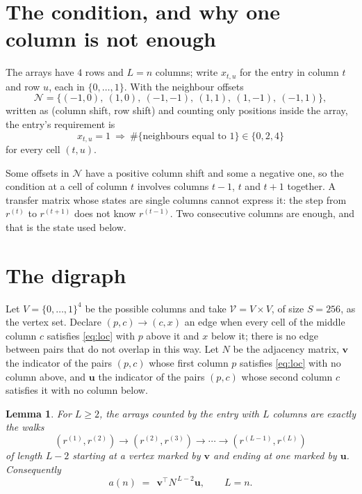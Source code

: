 \documentclass[11pt,a4paper]{article}
\theoremstyle{plain}
\newtheorem{lemma}[theorem]{Lemma}
\theoremstyle{definition}
\begin{document}
\section{The condition, and why one column is not enough}

The arrays have $4$ rows and $L=n$ columns; write $x_{t,u}$ for the entry in
column $t$ and row $u$, each in $\{0,\dots,1\}$. With the neighbour offsets
\[
\mathcal N=\{(-1,0),\ (1,0),\ (-1,-1),\ (1,1),\ (1,-1),\ (-1,1)\},
\]
written as (column shift, row shift) and counting only positions inside the array, the
entry's requirement is
\begin{equation}\label{eq:loc}
x_{t,u}=1\ \Rightarrow\ \#\{\text{neighbours equal to }1\}\in\{0,2,4\}
\end{equation}
for every cell $(t,u)$.

Some offsets in $\mathcal N$ have a positive column shift and some a negative one, so the
condition at a cell of column $t$ involves columns $t-1$, $t$ and $t+1$ together. A transfer
matrix whose states are single columns cannot express it: the step from $r^{(t)}$ to
$r^{(t+1)}$ does not know $r^{(t-1)}$. Two consecutive columns are enough, and that is
the state used below.

\section{The digraph}

Let $V=\{0,\dots,1\}^{4}$ be the possible columns and take
$\mathcal V=V\times V$, of size $S=256$, as the vertex set. Declare $(p,c)\to(c,x)$ an edge
when every cell of the middle column $c$ satisfies \eqref{eq:loc} with $p$ above it and $x$
below it; there is no edge between pairs that do not overlap in this way. Let $N$ be the
adjacency matrix, $\mathbf{v}$ the indicator of the pairs $(p,c)$ whose first column $p$
satisfies \eqref{eq:loc} with no column above, and $\mathbf{u}$ the indicator of
the pairs $(p,c)$ whose second column $c$ satisfies it with no column below.

\begin{lemma}\label{lem:walk}
For $L\ge2$, the arrays counted by the entry with $L$ columns are exactly the walks
\[
(r^{(1)},r^{(2)})\to(r^{(2)},r^{(3)})\to\cdots\to(r^{(L-1)},r^{(L)})
\]
of length $L-2$ starting at a vertex marked by $\mathbf{v}$ and ending at one marked by
$\mathbf{u}$. Consequently
\[
a(n)\;=\;\,\mathbf{v}^{\!\top}N^{\,L-2}\mathbf{u},\qquad L=n .
\]
\end{lemma}
\end{document}
